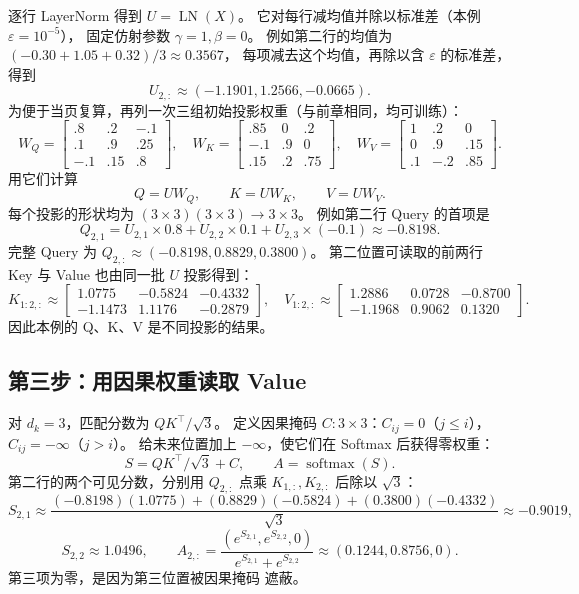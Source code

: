 逐行 LayerNorm 得到 $U=\operatorname{LN}(X)$。
它对每行减均值并除以标准差（本例 $\varepsilon=10^{-5}$），
固定仿射参数 $\gamma=1,\beta=0$。
例如第二行的均值为 $(-0.30+1.05+0.32)/3\approx0.3567$，
每项减去这个均值，再除以含 $\varepsilon$ 的标准差，得到
\[
U_{2,:}\approx(-1.1901,1.2566,-0.0665).
\]
为便于当页复算，再列一次三组初始投影权重（与前章相同，均可训练）：
\[
W_Q=\begin{bmatrix}.8&.2&-.1\\.1&.9&.25\\-.1&.15&.8\end{bmatrix},\quad
W_K=\begin{bmatrix}.85&0&.2\\-.1&.9&0\\.15&.2&.75\end{bmatrix},\quad
W_V=\begin{bmatrix}1&.2&0\\0&.9&.15\\.1&-.2&.85\end{bmatrix}.
\]
用它们计算
\[
Q=UW_Q,\qquad K=UW_K,\qquad V=UW_V.
\]
每个投影的形状均为 $(3\times3)(3\times3)\to3\times3$。
例如第二行 Query 的首项是
\[
Q_{2,1}=U_{2,1}\times0.8+U_{2,2}\times0.1+U_{2,3}\times(-0.1)
\approx-0.8198.
\]
完整 Query 为 $Q_{2,:}\approx(-0.8198,0.8829,0.3800)$。
第二位置可读取的前两行 Key 与 Value 也由同一批 $U$ 投影得到：
\[
K_{1:2,:}\approx\begin{bmatrix}1.0775&-0.5824&-0.4332\\-1.1473&1.1176&-0.2879\end{bmatrix},
\quad
V_{1:2,:}\approx\begin{bmatrix}1.2886&0.0728&-0.8700\\-1.1968&0.9062&0.1320\end{bmatrix}.
\]
因此本例的 Q、K、V 是不同投影的结果。

\subsection{第三步：用因果权重读取 Value}

对 $d_k=3$，匹配分数为 $QK^\top/\sqrt3$。
定义因果掩码 $C:3\times3$：$C_{ij}=0$（$j\le i$），$C_{ij}=-\infty$（$j>i$）。
给未来位置加上 $-\infty$，使它们在 Softmax 后获得零权重：
\begin{equation}
S=QK^\top/\sqrt3+C,\qquad A=\operatorname{softmax}(S).
\label{eq:two-token-scores}
\end{equation}
第二行的两个可见分数，分别用 $Q_{2,:}$ 点乘 $K_{1,:},K_{2,:}$ 后除以 $\sqrt3$：
\[
S_{2,1}\approx\frac{(-0.8198)(1.0775)+(0.8829)(-0.5824)+(0.3800)(-0.4332)}{\sqrt3}
\approx-0.9019,
\]
\[
S_{2,2}\approx1.0496,\qquad
A_{2,:}=\frac{(e^{S_{2,1}},e^{S_{2,2}},0)}{e^{S_{2,1}}+e^{S_{2,2}}}
\approx(0.1244,0.8756,0).
\]
第三项为零，是因为第三位置被因果掩码 遮蔽。


